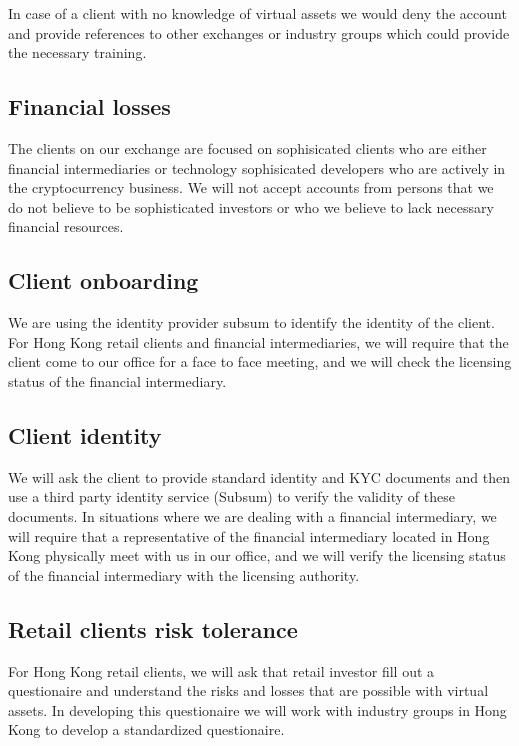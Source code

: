 In case of a client with no knowledge of virtual assets we would deny
the account and provide references to other exchanges or industry
groups which could provide the necessary training.

\subsection{Financial losses}

The clients on our exchange are focused on sophisicated clients who
are either financial intermediaries or technology sophisicated
developers who are actively in the cryptocurrency business.  We will
not accept accounts from persons that we do not believe to be
sophisticated investors or who we believe to lack necessary financial
resources.

\subsection{Client onboarding}

We are using the identity provider subsum to identify the identity of
the client.  For Hong Kong retail clients and financial
intermediaries, we will require that the client come to our office for
a face to face meeting, and we will check the licensing status of the
financial intermediary.

\subsection{Client identity}
We will ask the client to provide standard identity and KYC documents
and then use a third party identity service (Subsum) to verify the
validity of these documents.  In situations where we are dealing with
a financial intermediary, we will require that a representative of the
financial intermediary located in Hong Kong physically meet with us in
our office, and we will verify the licensing status of the financial
intermediary with the licensing authority.

\subsection{Retail clients risk tolerance}

For Hong Kong retail clients, we will ask that retail investor fill
out a questionaire and understand the risks and losses that are
possible with virtual assets.  In developing this questionaire we will
work with industry groups in Hong Kong to develop a standardized
questionaire.


